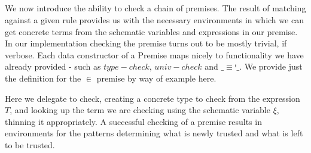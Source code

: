 \begin{code}%
\>[0]%
\>[7]\AgdaSymbol{:}%
\>[10]%
\>[36]\<%
\\
%
\>[10]\AgdaSpace{}%
%
\>[34]\<%
\\
%
\>[10]\AgdaSymbol{(}\AgdaSpace{}%
\AgdaSymbol{:}\AgdaSpace{}%
\AgdaSpace{}%
\AgdaSpace{}%
\AgdaSymbol{)}%
\>[34]\<%
\\
%
\>[10]\AgdaSymbol{(}\AgdaSpace{}%
\AgdaSymbol{:}\AgdaSpace{}%
\AgdaSpace{}%
\AgdaSpace{}%
\AgdaSymbol{)}%
\>[34]\<%
\\
%
\>[10]\AgdaSpace{}%
\<%
\\
\>[0]\<%
\\
\>[0]%
\>[7]\AgdaSymbol{:}%
\>[10]%
\>[35]\<%
\\
%
\>[10]\AgdaSpace{}%
%
\>[33]\<%
\\
%
\>[10]\AgdaSymbol{(}\AgdaSpace{}%
\AgdaSymbol{:}\AgdaSpace{}%
\AgdaSpace{}%
\AgdaSpace{}%
\AgdaSymbol{)}%
\>[33]\<%
\\
%
\>[10]\AgdaSpace{}%
\AgdaSymbol{(}\AgdaSpace{}%
\AgdaSpace{}%
\AgdaSymbol{)}\<%
\end{code}

We now introduce the ability to check a chain of premises. The result of
matching against a given rule provides us with the necessary environments
in which we can get concrete terms from the schematic variables and
expressions in our premise. In our implementation checking the premise
turns out to be mostly trivial, if verbose. Each data constructor of a Premise
maps nicely to functionality we have already provided - such as $type-check$,
$univ-check$ and $\_≡ᵗ\_$. We provide just the definition for the $∈$ premise
by way of example here.

Here we delegate to check, creating a concrete type to check from the
expression $T$, and looking up the term we are checking using the schematic
variable $ξ$, thinning it appropriately. A successful checking of a premise
results in environments for the patterns determining what is newly
trusted and what is left to be trusted.

